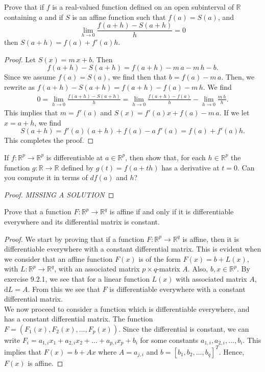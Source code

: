 \documentclass[12pt]{book}
\newcommand{\R}{\mathbb{R}}
\newenvironment{exercise}[2][Exercise]{\begin{trivlist}
\item[\hskip \labelsep {\bfseries #1}\hskip \labelsep {\bfseries #2.}]}{\end{trivlist}}
\begin{document}
\begin{exercise}{7.2.7}
\begin{exercise}{9.2.7}
	Prove that if $f$ is a real-valued function defined on an open subinterval of $\R$ containing $a$ and if $S$ is an affine function such that $f(a) = S(a)$, and
		\[ \lim_{h \to 0} \frac{f(a+h) - S(a+h)}{h} = 0 \]
	then $S(a+h) = f(a) + f'(a) h$.

	\begin{proof}
	Let $S(x)= m\,x + b $. Then
	    \[ f(a+h)  - S(a+h) = f(a+h) - m\,a - m\,h - b. \]
	Since we assume $f(a)=S(a)$, we find then that $ b = f(a) - m \,a $. Then, we rewrite as $f(a+h) - S(a+h) = f(a+h) - f(a) - m\,h $. We find
	  \begin{align*}
	    0 = \lim_{h \to 0} \frac{f(a+h)-S(a+h)}{h} = \lim_{h \to 0} \frac{f(a+h) - f(a)}{h} - \lim_{h \to 0} \frac{m\,h}{h}.
	  \end{align*}
	This implies that $m = f'(a)$ and $S(x) = f'(a) x + f(a) - m\,a$. If we let $x= a+h$, we find
	    \[ S(a+h) = f'(a) (a+h) + f(a) - a\, f'(a) = f(a) + f'(a)h. \]
	This completes the proof.
	\end{proof}
\end{exercise}


\begin{exercise}{9.2.11}
	If $f : \R^p \to \R^p$ is differentiable at $a \in \R^p$, then show that, for each $h \in \R^p$ the function $g: \R \to \R$ defined by $g(t) = f(a + t h)$ has a derivative at $t = 0$. Can you compute it in terms of $d f(a) $ and $h$?

	\begin{proof}
	\emph{MISSING A SOLUTION}
	\end{proof}
\end{exercise}


\begin{exercise}{9.2.12}
	Prove that a function $F: \R^p \to \R^q$ is affine if and only if it is differentiable everywhere and its differential matrix is constant.

	\begin{proof}
    We start by proving that if a function $F: \R^p \to \R^q$ is affine, then it is differentiable everywhere with a constant differential matrix. This is evident when we consider that an affine function $F(x)$ is of the form $F(x) = b + L(x)$, with $L: \R^p \to \R^q$, with an associated matrix $p \times q$-matrix $A$. Also, $b,x \in \R^p$. By exercise 9.2.1, we see that for a linear function $L(x)$ with associated matrix $A$, $\text{d}L=A$. From this we see that $F$ is differentiable everywhere with a constant differential matrix. \\
    We now proceed to consider a function which is differentiable everywhere, and has a constant differential matrix. The function $F = (F_1(x), F_2(x), \hdots, F_p (x) )$. Since the differential is constant, we can write $F_i= a_{1,i} x_1 + a_{2,i} x_2 + \hdots + a_{p,i} x_p + b_i $ for some constants $a_{1,i}, a_{2,i}, ..., b_i$. This implies that $F(x) = b + A x$ where $A=a_{j,i}$ and $b = [b_1, b_2, \hdots, b_q ]^T$. Hence, $F(x)$ is affine.
	\end{proof}
\end{exercise}




\end{exercise}
\end{document}
